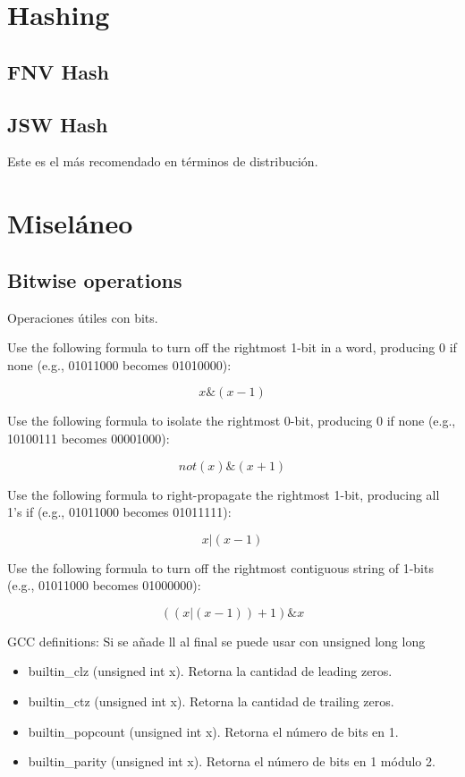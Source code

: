\documentclass[10pt,letterpaper,twocolumn,twosided]{article}
\newcommand{\codigofuente}[1]{

\dotfill
}
\begin{document}
\section{Hashing} %

\subsection{FNV Hash}

\codigofuente{src/hashing/FNV.cpp}

\subsection{JSW Hash}
Este es el más recomendado en términos de distribución.
\codigofuente{src/hashing/JSW.cpp}

\section{Miseláneo}

\subsection {Bitwise operations}
Operaciones útiles con bits.

Use the following formula to turn off the rightmost 1-bit in a word, producing
0 if none (e.g., 01011000 becomes 01010000):

$$x \& (x - 1)$$

Use the following formula to isolate the rightmost 0-bit, producing 0 if none
(e.g., 10100111 becomes 00001000):

$$ not(x) \& (x + 1)$$

Use the following formula to right-propagate the rightmost 1-bit, producing
all 1’s if  (e.g., 01011000 becomes 01011111):

$$ x | (x - 1 )$$

Use the following formula to turn off the rightmost contiguous string of 1-bits
(e.g., 01011000 becomes 01000000):

$$ ((x | (x - 1 )) + 1 ) \& x$$

\codigofuente{src/bitwise.cpp}

GCC definitions:
Si se añade ll al final se puede usar con unsigned long long

\begin{itemize}
\item \verb __builtin_clz (unsigned int x). Retorna la cantidad de leading zeros.
\item \verb __builtin_ctz (unsigned int x). Retorna la cantidad de trailing zeros.
\item \verb __builtin_popcount (unsigned int x). Retorna el número de bits en 1.
\item \verb __builtin_parity (unsigned int x). Retorna el número de bits en 1 módulo 2.
\end{itemize}
\end{document}

